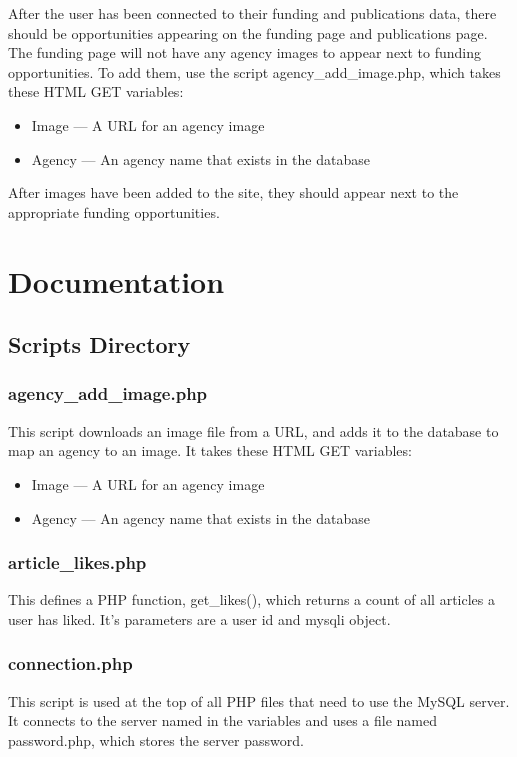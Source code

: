 \documentclass[onecolumn]{IEEEtran}
\begin{document}
After the user has been connected to their funding and publications data, there should be opportunities appearing on the funding page and publications page. The funding page will not have any agency images to appear next to funding opportunities. To add them, use the script agency\_add\_image.php, which takes these HTML GET variables: 
\begin{itemize}
    \item Image --- A URL for an agency image 
    \item Agency --- An agency name that exists in the database 
\end{itemize}
    
After images have been added to the site, they should appear next to the appropriate funding opportunities. 

\section{Documentation}

\subsection{Scripts Directory}
\subsubsection{agency\_add\_image.php}
This script downloads an image file from a URL, and adds it to the database to map an agency to an image. It takes these HTML GET variables: 
\begin{itemize}
    \item Image --- A URL for an agency image 
    \item Agency --- An agency name that exists in the database 
\end{itemize}    

\subsubsection{article\_likes.php}
This defines a PHP function, get\_likes(), which returns a count of all articles a user has liked. It's parameters are a user id and mysqli object. 

\subsubsection{connection.php}
This script is used at the top of all PHP files that need to use the MySQL server. It connects to the server named in the variables and uses a file named password.php, which stores the server password. 
\end{document}
